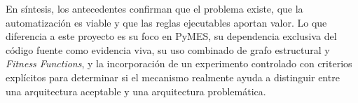 En síntesis, los antecedentes confirman que el problema existe, que la automatización es viable y que las reglas ejecutables aportan valor. Lo que diferencia a este proyecto es su foco en PyMES, su dependencia exclusiva del código fuente como evidencia viva, su uso combinado de grafo estructural y \textit{Fitness Functions}, y la incorporación de un experimento controlado con criterios explícitos para determinar si el mecanismo realmente ayuda a distinguir entre una arquitectura aceptable y una arquitectura problemática.